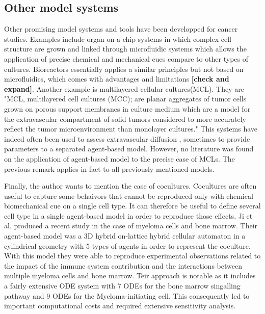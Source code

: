 \documentclass[11pt,a4paper]{article}
\begin{document}
\subsection{Other model systems}
Other promising model systems and tools have been developped for cancer studies. Examples include organ-on-a-chip systems in which complex cell structure are grown and linked through microfluidic systems which allows the application of precise chemical and mechanical cues compare to other types of cultures. Bioreactors essentially applies a similar principles but not based on microfluidics, which comes with advantages and limitations \textbf{[check and expand]}. Another example is multilayered cellular cultures(MCL). They are "MCL, multilayered cell cultures (MCC); are planar aggregates of tumor cells grown on porous support membranes in culture medium which are a model for the extravascular compartment of solid tumors considered to more accurately reflect the tumor microenvironment than monolayer cultures." \cite{Schwab2011} This systems have indeed often been used to assess extravascular diffusion \cite{Al-abd2008}, sometimes to provide parameters to a separated agent-based model\cite{Hong2018}. However, no literature was found on the application of agent-based model to the precise case of MCLs. The previous remark applies in fact to all previously mentioned models.

Finally, the author wants to mention the case of cocultures. Cocultures are often useful to capture some behaivors that cannot be reproduced only with chemical biomechanical cue on a single cell type. It can therefore be useful to define several cell type in a single agent-based model in order to reproduce those effects. Ji et al. produced a recent study in the case of myeloma cells and bone marrow.\cite{Ji2016} Their agent-based model was a 3D hybrid on-lattice hybrid cellular automaton in a cylindrical geometry with 5 types of agents in order to represent the coculture. With this model they were able to reproduce experimental observations related to the impact of the immune system contribution and the interactions between multiple myeloma cells and bone marrow. Teir approach is notable as it includes a fairly extensive ODE system with 7 ODEs for the bone marrow singalling pathway and 9 ODEs for the Myeloma-initiating cell. This consequently led to important computational costs and required extensive sensitivity analysis.
\end{document}
